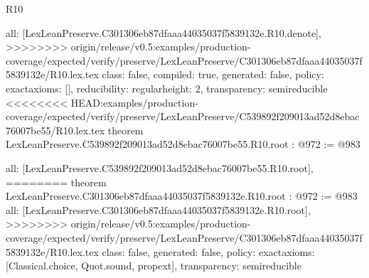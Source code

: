 \begin{lexlean}{R10}
\begin{coremodule}
{{{{{  all: [LexLeanPreserve.C301306eb87dfaaa44035037f5839132e.R10.denote],
>>>>>>>> origin/release/v0.5:examples/production-coverage/expected/verify/preserve/LexLeanPreserve/C301306eb87dfaaa44035037f5839132e/R10.lex.tex
  class: false,
  compiled: true,
  generated: false,
  policy: exact{axioms: []},
  reducibility: regular{height: 2},
  transparency: semireducible
}
<<<<<<<< HEAD:examples/production-coverage/expected/verify/preserve/LexLeanPreserve/C539892f209013ad52d8ebac76007be55/R10.lex.tex
theorem LexLeanPreserve.C539892f209013ad52d8ebac76007be55.R10.root : @972 := @983 {
  all: [LexLeanPreserve.C539892f209013ad52d8ebac76007be55.R10.root],
========
theorem LexLeanPreserve.C301306eb87dfaaa44035037f5839132e.R10.root : @972 := @983 {
  all: [LexLeanPreserve.C301306eb87dfaaa44035037f5839132e.R10.root],
>>>>>>>> origin/release/v0.5:examples/production-coverage/expected/verify/preserve/LexLeanPreserve/C301306eb87dfaaa44035037f5839132e/R10.lex.tex
  class: false,
  generated: false,
  policy: exact{axioms: [Classical.choice, Quot.sound, propext]},
  transparency: semireducible
}

}}}}}
\end{coremodule}
\end{lexlean}
